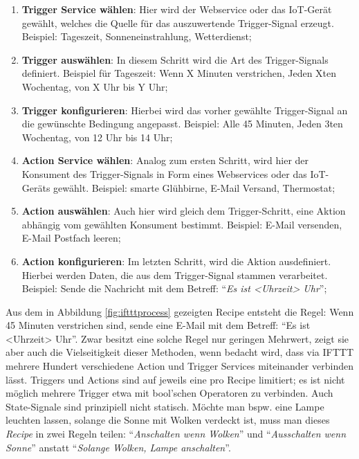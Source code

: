 \begin{enumerate}
    \item \textbf{Trigger Service wählen}: Hier wird der Webservice oder das IoT-Gerät gewählt, welches die Quelle für das auszuwertende Trigger-Signal erzeugt. Beispiel: Tageszeit, Sonneneinstrahlung, Wetterdienst;
    \item \textbf{Trigger auswählen}: In diesem Schritt wird die Art des Trigger-Signals definiert. Beispiel für Tageszeit: Wenn X Minuten verstrichen, Jeden Xten Wochentag, von X Uhr bis Y Uhr;
    \item \textbf{Trigger konfigurieren}: Hierbei wird das vorher gewählte Trigger-Signal an die gewünschte Bedingung angepasst. Beispiel: Alle 45 Minuten, Jeden 3ten Wochentag, von 12 Uhr bis 14 Uhr;
    \item \textbf{Action Service wählen}: Analog zum ersten Schritt, wird hier der Konsument des Trigger-Signals in Form eines Webservices oder das IoT-Geräts gewählt. Beispiel: smarte Glühbirne, E-Mail Versand, Thermostat;
    \item \textbf{Action auswählen}: Auch hier wird gleich dem Trigger-Schritt, eine Aktion abhängig vom gewählten Konsument bestimmt. Beispiel: E-Mail versenden, E-Mail Postfach leeren;
    \item \textbf{Action konfigurieren}: Im letzten Schritt, wird die Aktion ausdefiniert. Hierbei werden Daten, die aus dem Trigger-Signal stammen verarbeitet. Beispiel: Sende die Nachricht mit dem Betreff: "`\textit{Es ist <Uhrzeit> Uhr}"';
\end{enumerate}
Aus dem in Abbildung \ref{fig:iftttprocess} gezeigten Recipe entsteht die Regel: Wenn 45 Minuten verstrichen sind, sende eine E-Mail mit dem Betreff: "`Es ist <Uhrzeit> Uhr"'. Zwar besitzt eine solche Regel nur geringen Mehrwert, zeigt sie aber auch die Vielseitigkeit dieser Methoden, wenn bedacht wird, dass via IFTTT mehrere Hundert verschiedene Action und Trigger Services miteinander verbinden lässt. Triggers und Actions sind auf jeweils eine pro Recipe limitiert; es ist nicht möglich mehrere Trigger etwa mit bool'schen Operatoren zu verbinden. Auch State-Signale sind prinzipiell nicht statisch. Möchte man bspw. eine Lampe leuchten lassen, solange die Sonne mit Wolken verdeckt ist, muss man dieses \textit{Recipe} in zwei Regeln teilen: "`\textit{Anschalten wenn Wolken}"' und "`\textit{Ausschalten wenn Sonne}"' anstatt "`\textit{Solange Wolken, Lampe anschalten}"'.

